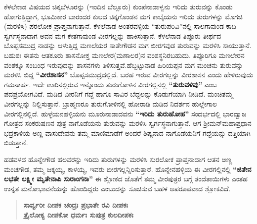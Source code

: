 ಕೆಳಲೆನಾಡ ವಿಷಯದ ಚಿಕ್ಕಬೆಳೂರನ್ನು (ಇಂದಿನ ಬೆಲ್ಲೂರು) ಕುಂಪೆನಾಡಾಳ್ವನು ಇರಿದು ತುರುವನ್ನು ಕೊಂಡು ಹೋಗುತ್ತಿದ್ದಾಗ, ಭೂಮಿಕಾರ ಬಾರಂದರ ಕುಲದ ಚಿಕ್ಕಗೊಂಡನ ಮಗ ಕಾಬೈಯನು ಇರಿದು ತುರುಗಳನ್ನು ಮೊಗಚಿ (ಮರಳಿಸಿ) ಪರಲೋಕ ಪ್ರಾಪ್ತನಾಗುತ್ತಾನೆ. ಕೆಳಲೆನಾಡ ಅಂತರವಳ್ಳಿಯ “ತುರುಪರಿವಿ”ನಲ್ಲಿ ಸಾಲಗಾವುಂಡ ಕಾದಿ ಸ್ವರ್ಗಸ್ಥನಾದಾಗ ಅವನ ಮಗ ಕೇತಗಾವುಂಡ ವೀರಗಲ್ಲನ್ನು ಹಾಕಿಸುತ್ತಾನೆ. ಕೆಳಲೆನಾಡ ತಿಪ್ಪೂರು ತೀರ್ಥದ ಬೊಪ್ಪಸಮುದ್ರ ನಾಡನ್ನು ಆಳುತ್ತಿದ್ದ ಮಣಲೆಯರ ಸಾತೇಗೌಡನ ಮಗ ಬೀರಗವುಡ ತುರುವನ್ನು ಮರಳಿಸಿ ಸಾಯುತ್ತಾನೆ. ಬಹುಶಃ ಈತನು ಆತಕೂರು ಶಾಸನೋಕ್ತ ಮಣಲೇರ(ಮಣಾಲರ)ನ ವಂಶಸ್ಥನಿರಬಹುದು. ತಿಪ್ಪೂರಿಗೂ ಮಣಲೇರನ ವಂಶಕ್ಕೂ ಸಂಬಂಧ ಇರುವುದನ್ನು ಶಾಸನಗಳು ತಿಳಿಸುತ್ತವೆ.ಹೆಬ್ಬಟ್ಟುನಾಡ ಹಿರಿಯಪ್ಪನ ಮಗ ಮಂಚನು ತುರುವನ್ನು ಮರಳಿಸಿ ಬಿದ್ದ \textbf{“ವೀರಶಾಸನ”} ಬೊಪ್ಪಸಮುದ್ರದಲ್ಲಿದೆ. ಬರಹ ಇರುವ ವೀರಗಲ್ಲನ್ನು ವೀರಶಾಸನ ಎಂದು ಹೇಳಿರುವುದು ಗಮನಾರ್ಹ. ಇದೇ ಊರಿನಲ್ಲಿರುವ ಇನ್ನೊಂದು ತುರುಗೋಳಿನ ವೀರಗಲ್ಲಿನಲ್ಲಿ \textbf{“ತುರುವಳಿವು”} ಎಂಬ ಪದಪ್ರಯೋಗವಿದೆ. ಮಡಿದ ವೀರನಿಗೆ ಗದ್ದೆ ಹಾಗೂ ಸಾವಿರ ಬೆದ್ದಲನ್ನು ಕೊಡುಗೆಯಾಗಿ ನೀಡಿದೆ. ಮಂಚಿತಮ್ಮ ವೀರಗಲ್ಲನ್ನು ನಿಲ್ಲಿಸುತ್ತಾನೆ. ಬ್ರಾಹ್ಮಣರೂ ತುರುಗೋಳಿನಲ್ಲಿ ಹೋರಾಡಿ ಮಡಿದ ನಿದರ್ಶನ ಹುಲ್ಲೇಗಾಲ ವೀರಗಲ್ಲಿನಲ್ಲಿದೆ. ಹುಳ್ಳೆಯನಹಳ್ಳಿಯನು ಮೂರುನಾಡಾದವನು \textbf{“ಇರಿದು ತುರುಹೋಹ”} ಸಂದರ್ಭದಲ್ಲಿ ಭಾರದ್ವಾಜ ಗೋತ್ರದ ಸಂಕರುಷಣನ ಪುತ್ರ ನಾಗೊಡೆಯನು ತುರುವನ್ನು ಮರಳಿಸಿ ಸ್ವರ್ಗಸ್ಥನಾಗುತ್ತಾನೆ. ಆಗ ಶ‍್ರೀಮನ್​ಮಹಾಪ್ರಧಾನ ಭದ್ರಕಾಳಿಯ ಅಣ್ಣ ವಾಸುದೇವನು ತಮ್ಮ ಮಾಣಿಮಾಡೆಗೆ ಅಂದರೆ ಶಿಷ್ಯನಾದ ನಾಗೊಡೆಯನಿಗೆ ಗದ್ದೆಯನ್ನು ದತ್ತಿಯಾಗಿ ಬಿಡುತ್ತಾನೆ.

ಹಡವಳದ ಹೊನ್ನೇಗೌಡ ಹಲವರನ್ನು ಇರಿದು ತುರುಗಳನ್ನು ಮರಳಿಸಿ ಸುರಲೋಕ ಪ್ರಾಪ್ತನಾದಾಗ ಆತನ ಅಣ್ಣ ಮಂಚಗೌಡ, ತಮ್ಮ ಜಕ್ಕಯ್ಯ, ಕಾಳಯ್ಯ, ಇವರು ಬೀರಗಲ್ಲನ್ನಿರಿಸುತ್ತಾರೆ. ಹೊನ್ನೇನಹಳ್ಳಿಯ ಈ ವೀರಗಲ್ಲಿನಲ್ಲಿ \textbf{“ಜಿತೇನ ಲಭತೇ ಲಕ್ಷ್ಮೀ ಮೃತೇನಾಪಿ ಸುರಾಂಗನಾ”} ಈ ಶ್ಲೋಕದ ಜೊತೆಗೆ ತಮ್ಮ ವೀರಪುತ್ರರ ಬಗ್ಗೆ ತಂದೆತಾಯಿಗಳು ಎಂತಹ ಉನ್ನತ ಮನೋಭಾವನೆಯನ್ನು ಹೊಂದಿದ್ದರು ಎಂಬುದನ್ನು ಸೂಚಿಸುವ ಬಹಳ ಅಪರೂಪವಾದ ಶ್ಲೋಕವಿದೆ.

\begin{verse}
\textbf{ಸಾರ್ವ್ವರೀ ದೀಪಕ ಚಂದ್ರಃ ಪ್ರಭಾತೇ ರವಿ ದೀಪಕಃ } \\\textbf{ ತ್ರೈಲೋಕ್ಯ ದೀಪಕೋ ಧರ್ಮಃ ಸುಪುತ್ರ ಕುಲದೀಪಕಃ}
\end{verse}


